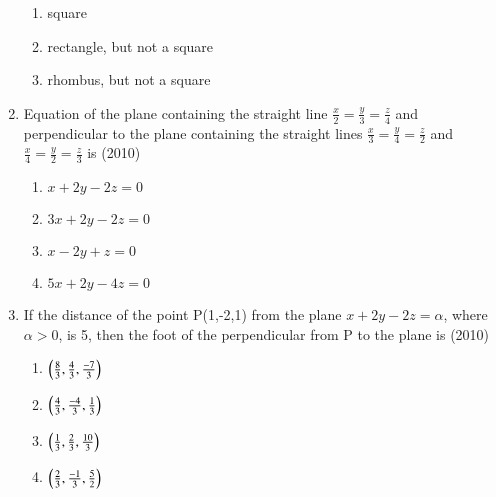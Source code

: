 \documentclass[journal,12pt,twocolumn]{IEEEtran}
\theoremstyle{remark}
\begin{document}
\begin{enumerate}
\begin{enumerate}[label=(\alph*)]
    \item square 
    \item rectangle, but not a square
    \item rhombus, but not a square 
    \end{enumerate}
    \item Equation of the plane containing the straight line $\frac{x}{2}=\frac{y}{3}=\frac{z}{4}$ and perpendicular to the plane containing the straight lines $\frac{x}{3}=\frac{y}{4}=\frac{z}{2}$ and $\frac{x}{4}=\frac{y}{2}=\frac{z}{3}$ is 
    \hfill{(2010)}
    \begin{enumerate}[label=(\alph*)]
    \item $x+2y-2z=0$
    \item $3x+2y-2z=0$
    \item $x-2y+z=0$
    \item $5x+2y-4z=0$
    \end{enumerate}
    \item If the distance of the point P(1,-2,1) from the plane $x+2y-2z=\alpha$, where $\alpha>0$, is 5, then the foot of the perpendicular from P to the plane is
    \hfill{(2010)}
    \begin{enumerate}[label=(\alph*)]
    \item $\left(\frac{8}{3}, \frac{4}{3}, \frac{-7}{3}\right)$
    \item $\left(\frac{4}{3}, \frac{-4}{3}, \frac{1}{3}\right)$
    \item $\left(\frac{1}{3}, \frac{2}{3}, \frac{10}{3}\right)$
    \item $\left(\frac{2}{3}, \frac{-1}{3}, \frac{5}{2}\right)$
    \end{enumerate}
    


\end{enumerate}
\end{document}
